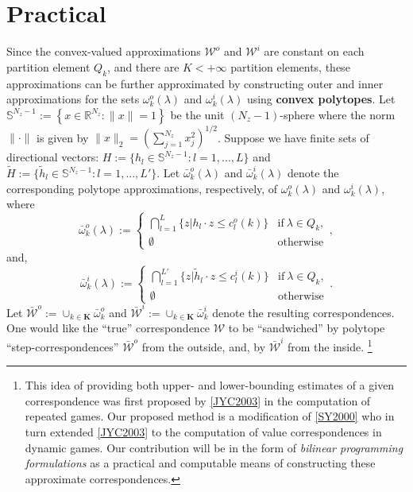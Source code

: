 \documentclass[a4paper,10pt,english]{sphinxmanual}
\begin{document}
\section{Practical}
\label{payoff_concept:practical}
Since the convex-valued approximations
$\mathcal{W}^o$ and $\mathcal{W}^i$ are constant on each partition
element $Q_k$, and there are $K < +\infty$ partition elements, these
approximations can be further approximated by constructing outer and inner
approximations for the sets $\omega^o_k (\lambda)$ and
$\omega^i_k (\lambda)$ using \textbf{convex polytopes}.
Let $\mathbb{S}^{N_z-1} := \left\{x \in \mathbb{R}^{N_z} : \| x \| = 1 \right\}$ be the unit $(N_z - 1)$-sphere where the norm $\| \cdot \|$ is given by $\| x \|_{2} = \left(\sum_{j=1}^{N_z} x_{j}^2\right)^{1/2}$. Suppose we have finite sets of directional vectors: $H := \{ h_l \in
\mathbb{S}^{N_z-1} : l = 1,...,L \}$ and $\tilde{H} := \{ \tilde{h}_l \in
\mathbb{S}^{N_z-1} : l = 1,...,L' \}$.
Let
$\bar{\omega}^o_k (\lambda)$ and $\bar{\omega}^i_k (\lambda)$
denote the corresponding polytope approximations, respectively, of $\omega^o_k (\lambda)$ and
$\omega^i_k (\lambda)$, where
     \begin{equation*}
        \bar{\omega}^o_k (\lambda) :=
        \begin{cases}
         \bigcap_{l=1}^{L}\{ z | h_l \cdot z \leq c_{l}^{o}(k) \} & \text{if} \ \lambda \in Q_k,\\
        \emptyset & \text{otherwise}
        \end{cases},
    \end{equation*}
and,
     \begin{equation*}
        \bar{\omega}^i_k (\lambda) :=
        \begin{cases}
         \bigcap_{l=1}^{L'}\{ z | \tilde{h}_l \cdot z \leq c_{l}^{i}(k) \} & \text{if} \ \lambda \in Q_k,\\
        \emptyset & \text{otherwise}
        \end{cases}.
    \end{equation*}
Let $\bar{\mathcal{W}}^o := \cup_{k \in \mathbf{K}}\bar{\omega}^o_k$
and $\bar{\mathcal{W}}^i :=  \cup_{k \in \mathbf{K}}\bar{\omega}^i_k$ denote the resulting correspondences. One would like the ``true'' correspondence $\mathcal{W}$ to be ``sandwiched'' by polytope ``step-correspondences'' $\bar{\mathcal{W}}^o$ from the outside, and, by  $\bar{\mathcal{W}}^i$ from the inside. \footnote{
This idea of providing both upper- and lower-bounding estimates of a given
correspondence was first proposed by {\hyperref[payoff_compute:jyc2003]{{[}JYC2003{]}}} in the computation of
repeated games. Our proposed method is a modification of {\hyperref[payoff_compute:sy2000]{{[}SY2000{]}}}
who in turn extended {\hyperref[payoff_compute:jyc2003]{{[}JYC2003{]}}} to the computation of value correspondences
in dynamic games. Our
contribution will be in the form of \emph{bilinear programming formulations} as
a practical and computable means of constructing these approximate correspondences.
}
\end{document}
